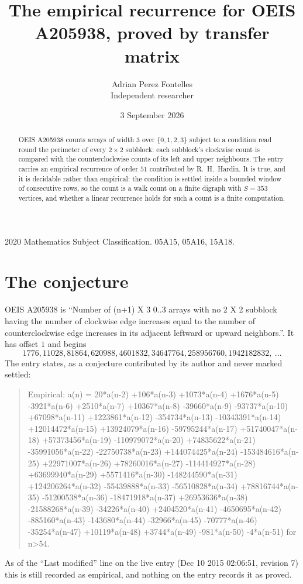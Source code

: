 \documentclass[11pt,a4paper]{article}
\title{The empirical recurrence for OEIS A205938, proved by transfer matrix}
\author{Adrian Perez Fontelles\\ \small Independent researcher}
\date{3 September 2026}
\theoremstyle{plain}
\theoremstyle{definition}
\begin{document}
\maketitle

\begin{abstract}
OEIS A205938 counts arrays of width $3$ over $\{0,1,2,3\}$ subject to a condition read round the
perimeter of every $2\times2$ subblock: each subblock's clockwise count is compared with the counterclockwise counts of its left and upper neighbours. The entry carries an empirical recurrence of
order $51$ contributed by R.~H.~Hardin. It is true, and it is decidable rather than
empirical: the condition is settled inside a bounded window of consecutive rows, so the
count is a walk count on a finite digraph with $S=353$ vertices, and whether a linear
recurrence holds for such a count is a finite computation.
\end{abstract}

\noindent\small 2020 Mathematics Subject Classification. 05A15, 05A16, 15A18.\normalsize

\section{The conjecture}

OEIS A205938 is ``Number of (n+1) X 3 0..3 arrays with no 2 X 2 subblock having the number of clockwise edge increases equal to the number of counterclockwise edge increases in its adjacent leftward or upward neighbors.''. It has offset $1$ and begins
\[
1776, 11028, 81864, 620988, 4601832, 34647764, 258956760, 1942182832,\ \dots
\]
The entry states, as a conjecture contributed by its author and never marked settled:
\begin{quote}
Empirical: a(n) = 20*a(n-2) +106*a(n-3) +1073*a(n-4) +1676*a(n-5) -3921*a(n-6) +2510*a(n-7) +10367*a(n-8) -39660*a(n-9) -93737*a(n-10) +67098*a(n-11) +1223861*a(n-12) -354734*a(n-13) -10343391*a(n-14) +12014472*a(n-15) +13924079*a(n-16) -59795244*a(n-17) +51740047*a(n-18) +57373456*a(n-19) -110979072*a(n-20) +74835622*a(n-21) -35991056*a(n-22) -22750738*a(n-23) +144074425*a(n-24) -153484616*a(n-25) +22971007*a(n-26) +78260016*a(n-27) -114414927*a(n-28) +63699940*a(n-29) +5571416*a(n-30) -148244590*a(n-31) +124206264*a(n-32) -55439888*a(n-33) -56510828*a(n-34) +78816744*a(n-35) -51200538*a(n-36) -18471918*a(n-37) +26953636*a(n-38) -21588268*a(n-39) -34226*a(n-40) +2404520*a(n-41) -4650695*a(n-42) -885160*a(n-43) -143680*a(n-44) -32966*a(n-45) -70777*a(n-46) -35254*a(n-47) +10119*a(n-48) +3744*a(n-49) -981*a(n-50) -4*a(n-51) for n>54.
\end{quote}
As of the ``Last modified'' line on the live entry (Dec 10 2015 02:06:51, revision 7) this is still
recorded as empirical, and nothing on the entry records it as proved.
\end{document}
